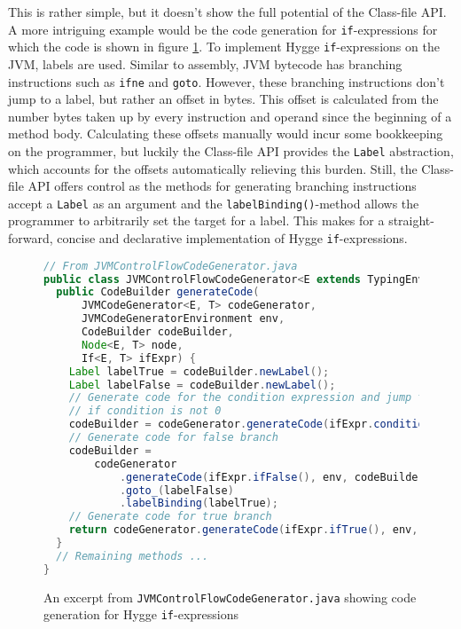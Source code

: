 This is rather simple, but it doesn't show the full potential of the Class-file API. A more intriguing example would be the code generation
for \texttt{if}-expressions for which the code is shown in figure \ref{fig:jvm_if_expressions}. To implement Hygge \texttt{if}-expressions on the JVM, labels are used. Similar to assembly, JVM bytecode
has branching instructions such as \texttt{ifne} and \texttt{goto}\cite{jvm_spec}. However, these branching instructions don't jump to a label, but rather an offset in bytes.
This offset is calculated from the number bytes taken up by every instruction and operand since the beginning of a method body. Calculating
these offsets manually would incur some bookkeeping on the programmer, but luckily the Class-file API provides the \texttt{Label}\cite{java_label} abstraction,
which accounts for the offsets automatically relieving this burden. Still, the Class-file API offers control as the methods for generating branching
instructions accept a \texttt{Label} as an argument and the \texttt{labelBinding()}-method\cite{java_codebuilder} allows the programmer to arbitrarily set the target for a label.
This makes for a straight-forward, concise and declarative implementation of Hygge \texttt{if}-expressions.

\begin{figure}[H]
\centering 
\begin{lstlisting}[language=Java]
// From JVMControlFlowCodeGenerator.java
public class JVMControlFlowCodeGenerator<E extends TypingEnvironment, T extends Type> {
  public CodeBuilder generateCode(
      JVMCodeGenerator<E, T> codeGenerator,
      JVMCodeGeneratorEnvironment env,
      CodeBuilder codeBuilder,
      Node<E, T> node,
      If<E, T> ifExpr) {
    Label labelTrue = codeBuilder.newLabel();
    Label labelFalse = codeBuilder.newLabel();
    // Generate code for the condition expression and jump to true branch
    // if condition is not 0
    codeBuilder = codeGenerator.generateCode(ifExpr.condition(), env, codeBuilder).ifne(labelTrue);
    // Generate code for false branch
    codeBuilder =
        codeGenerator
            .generateCode(ifExpr.ifFalse(), env, codeBuilder)
            .goto_(labelFalse)
            .labelBinding(labelTrue);
    // Generate code for true branch
    return codeGenerator.generateCode(ifExpr.ifTrue(), env, codeBuilder).labelBinding(labelFalse);
  }
  // Remaining methods ...
}
\end{lstlisting}
\caption{An excerpt from \texttt{JVMControlFlowCodeGenerator.java} showing code generation for Hygge \texttt{if}-expressions}
\label{fig:jvm_if_expressions}
\end{figure}


